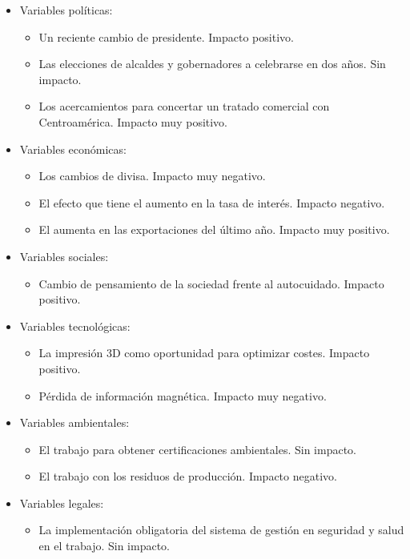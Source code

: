 \documentclass[a4paper]{article}
\begin{document}
\begin{itemize}
    \item Variables políticas:
    \begin{itemize}
        \item Un reciente cambio de presidente. Impacto positivo.
        \item Las elecciones de alcaldes y gobernadores a celebrarse en dos años. Sin impacto.
        \item Los acercamientos para concertar un tratado comercial con Centroamérica. Impacto muy positivo.
    \end{itemize}
    \item Variables económicas:
    \begin{itemize}
        \item Los cambios de divisa. Impacto muy negativo.
        \item El efecto que tiene el aumento en la tasa de interés. Impacto negativo.
        \item El aumenta en las exportaciones del último año. Impacto muy positivo.
    \end{itemize}
    \item Variables sociales:
    \begin{itemize}
        \item Cambio de pensamiento de la sociedad frente al autocuidado. Impacto positivo.
    \end{itemize}
    \item Variables tecnológicas:
    \begin{itemize}
        \item La impresión 3D como oportunidad para optimizar costes. Impacto positivo.
        \item Pérdida de información magnética. Impacto muy negativo.
    \end{itemize}
    \item Variables ambientales:
    \begin{itemize}
        \item El trabajo para obtener certificaciones ambientales. Sin impacto.
        \item El trabajo con los residuos de producción. Impacto negativo.
    \end{itemize}
    \item Variables legales:
    \begin{itemize}
        \item La implementación obligatoria del sistema de gestión en seguridad y salud en el trabajo. Sin impacto.
    \end{itemize}
\end{itemize}
\end{document}
